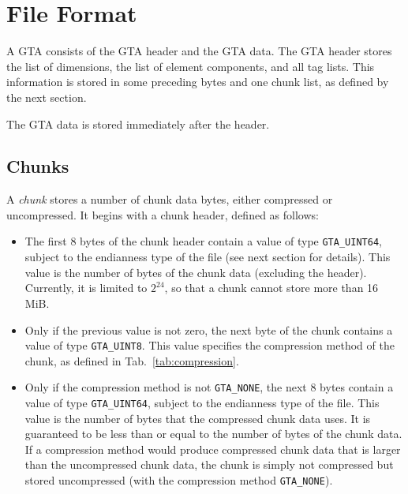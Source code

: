 \documentclass[a4paper,11pt]{article}
\newcommand{\code}[1]{\texttt{#1}}
\begin{document}
\section{File Format}

A GTA consists of the GTA header and the GTA data. The GTA header stores
the list of dimensions, the list of element components, and all tag lists.
This information is stored in some preceding bytes and one chunk list, as
defined by the next section.

The GTA data is stored immediately after the header.

\subsection{Chunks}

A \emph{chunk} stores a number of chunk data bytes, either compressed or uncompressed.
It begins with a chunk header, defined as follows:
\begin{itemize}
\item The first 8 bytes of the chunk header contain a value of type \code{GTA\_UINT64},
subject to the endianness type of the file (see next section for details).
This value is the number of bytes of the chunk data (excluding the
header). Currently, it is limited to $2^24$, so that a chunk cannot store more
than 16 MiB.
\item Only if the previous value is not zero, the next byte of the chunk
contains a value of type \code{GTA\_UINT8}.  This value specifies the
compression method of the chunk, as defined in Tab.~\ref{tab:compression}.
\item Only if the compression method is not \code{GTA\_NONE}, the next 8 bytes
contain a value of type \code{GTA\_UINT64}, subject to the endianness type of
the file. This value is the number of bytes that the compressed chunk data
uses. It is guaranteed to be less than or equal to the number of bytes of the
chunk data. If a compression method would produce compressed chunk data that
is larger than the uncompressed chunk data, the chunk is simply not compressed
but stored uncompressed (with the compression method \code{GTA\_NONE}).
\end{itemize}
\end{document}

